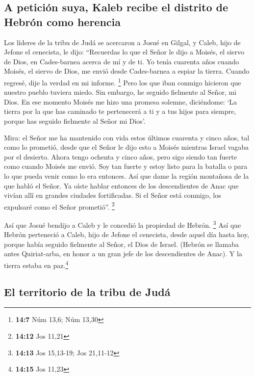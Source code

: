 \hypertarget{a-peticiuxf3n-suya-kaleb-recibe-el-distrito-de-hebruxf3n-como-herencia}{%
\subsection{A petición suya, Kaleb recibe el distrito de Hebrón como
herencia}\label{a-peticiuxf3n-suya-kaleb-recibe-el-distrito-de-hebruxf3n-como-herencia}}

 Los líderes de la tribu de Judá se acercaron a Josué en
Gilgal, y Caleb, hijo de Jefone el cenecista, le dijo: ``Recuerdas lo
que el Señor le dijo a Moisés, el siervo de Dios, en Cades-barnea acerca
de mí y de ti.  Yo tenía cuarenta años cuando Moisés, el
siervo de Dios, me envió desde Cades-barnea a espiar la tierra. Cuando
regresé, dije la verdad en mi informe. \footnote{\textbf{14:7} Núm 13,6;
  Núm 13,30}  Pero los que iban conmigo hicieron que
nuestro pueblo tuviera miedo. Sin embargo, he seguido fielmente al
Señor, mi Dios.  En ese momento Moisés me hizo una promesa
solemne, diciéndome: `La tierra por la que has caminado te pertenecerá a
ti y a tus hijos para siempre, porque has seguido fielmente al Señor mi
Dios'.

 Mira: el Señor me ha mantenido con vida estos últimos
cuarenta y cinco años, tal como lo prometió, desde que el Señor le dijo
esto a Moisés mientras Israel vagaba por el desierto. Ahora tengo
ochenta y cinco años,  pero sigo siendo tan fuerte como
cuando Moisés me envió. Soy tan fuerte y estoy listo para la batalla o
para lo que pueda venir como lo era entonces.  Así que
dame la región montañosa de la que habló el Señor. Ya oíste hablar
entonces de los descendientes de Anac que vivían allí en grandes
ciudades fortificadas. Si el Señor está conmigo, los expulsaré como el
Señor prometió''. \footnote{\textbf{14:12} Jos 11,21}

 Así que Josué bendijo a Caleb y le concedió la propiedad
de Hebrón. \footnote{\textbf{14:13} Jos 15,13-19; Jos 21,11-12}
 Así que Hebrón perteneció a Caleb, hijo de Jefone el
cenecista, desde aquel día hasta hoy, porque había seguido fielmente al
Señor, el Dios de Israel.  (Hebrón se llamaba antes
Quiriat-arba, en honor a un gran jefe de los descendientes de Anac). Y
la tierra estaba en paz.\footnote{\textbf{14:15} Jos 11,23}

\hypertarget{el-territorio-de-la-tribu-de-juduxe1}{%
\subsection{El territorio de la tribu de
Judá}\label{el-territorio-de-la-tribu-de-juduxe1}}


